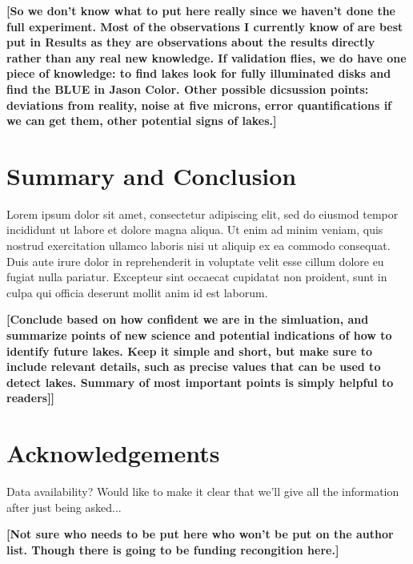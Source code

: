 \documentclass{article}
\begin{document}
\textbf{\color{red}[So we don't know what to put here really since we haven't done the full experiment. Most of the observations I currently know of are best put in Results as they are observations about the results directly rather than any real new knowledge. If validation flies, we do have one piece of knowledge: to find lakes look for fully illuminated disks and find the BLUE in Jason Color. Other possible dicsussion points: deviations from reality, noise at five microns, error quantifications if we can get them, other potential signs of lakes.]
\color{black}}

\section{Summary and Conclusion}
Lorem ipsum dolor sit amet, consectetur adipiscing elit, sed do eiusmod tempor incididunt ut labore et dolore magna aliqua. Ut enim ad minim veniam, quis nostrud exercitation ullamco laboris nisi ut aliquip ex ea commodo consequat. Duis aute irure dolor in reprehenderit in voluptate velit esse cillum dolore eu fugiat nulla pariatur. Excepteur sint occaecat cupidatat non proident, sunt in culpa qui officia deserunt mollit anim id est laborum. 

\textbf{\color{red}[Conclude based on how confident we are in the simluation, and summarize points of new science and potential indications of how to identify future lakes. Keep it simple and short, but make sure to include relevant details, such as precise values that can be used to detect lakes. Summary of most important points is simply helpful to readers]]\color{black}}

\section*{Acknowledgements}

\color{Green}Data availability? Would like to make it clear that we'll give all the information after just being asked...\color{black}

\textbf{\color{red}[Not sure who needs to be put here who won't be put on the author list. Though there is going to be funding recongition here.]\color{black}}

\printbibliography
\end{document}
